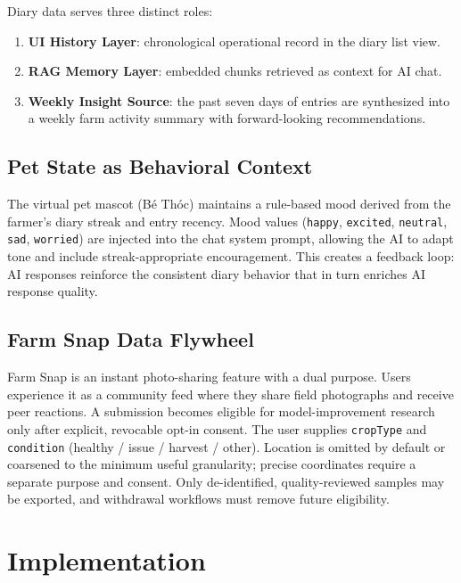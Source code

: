 \documentclass[conference]{IEEEtran}
\begin{document}
Diary data serves three distinct roles:
\begin{enumerate}
    \item \textbf{UI History Layer}: chronological operational record in the diary list view.
    \item \textbf{RAG Memory Layer}: embedded chunks retrieved as context for AI chat.
    \item \textbf{Weekly Insight Source}: the past seven days of entries are synthesized into a weekly farm activity summary with forward-looking recommendations.
\end{enumerate}

\subsection{Pet State as Behavioral Context}

The virtual pet mascot (B\'{e} Th\'{o}c) maintains a rule-based mood derived from the farmer's diary streak and entry recency. Mood values (\texttt{happy}, \texttt{excited}, \texttt{neutral}, \texttt{sad}, \texttt{worried}) are injected into the chat system prompt, allowing the AI to adapt tone and include streak-appropriate encouragement. This creates a feedback loop: AI responses reinforce the consistent diary behavior that in turn enriches AI response quality.

\subsection{Farm Snap Data Flywheel}

Farm Snap is an instant photo-sharing feature with a dual purpose. Users experience it as a community feed where they share field photographs and receive peer reactions. A submission becomes eligible for model-improvement research only after explicit, revocable opt-in consent. The user supplies \texttt{cropType} and \texttt{condition} (healthy / issue / harvest / other). Location is omitted by default or coarsened to the minimum useful granularity; precise coordinates require a separate purpose and consent. Only de-identified, quality-reviewed samples may be exported, and withdrawal workflows must remove future eligibility.

\section{Implementation}
\end{document}
